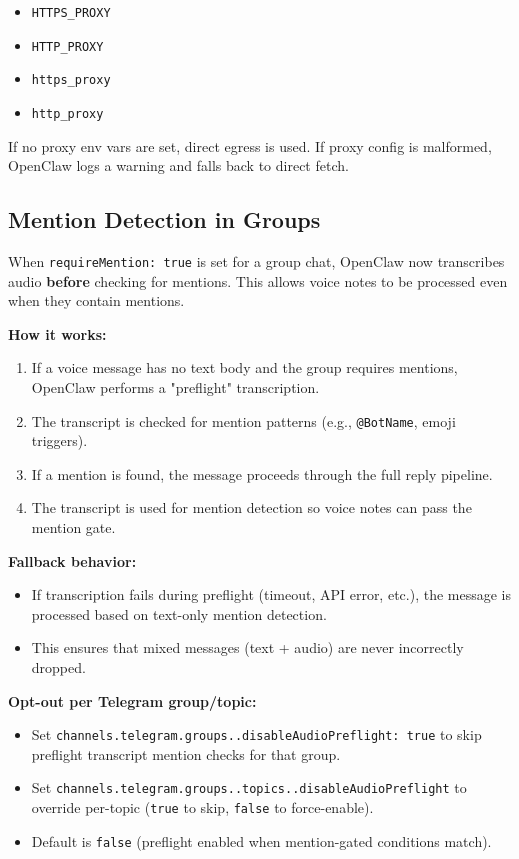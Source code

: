 \begin{itemize}
  \item \texttt{HTTPS\_PROXY}
  \item \texttt{HTTP\_PROXY}
  \item \texttt{https\_proxy}
  \item \texttt{http\_proxy}
\end{itemize}


If no proxy env vars are set, direct egress is used. If proxy config is malformed, OpenClaw logs a warning and falls back to direct fetch.

\subsection{Mention Detection in Groups}


When \texttt{requireMention: true} is set for a group chat, OpenClaw now transcribes audio \textbf{before} checking for mentions. This allows voice notes to be processed even when they contain mentions.

\textbf{How it works:}

\begin{enumerate}
  \item If a voice message has no text body and the group requires mentions, OpenClaw performs a "preflight" transcription.
  \item The transcript is checked for mention patterns (e.g., \texttt{@BotName}, emoji triggers).
  \item If a mention is found, the message proceeds through the full reply pipeline.
  \item The transcript is used for mention detection so voice notes can pass the mention gate.
\end{enumerate}


\textbf{Fallback behavior:}

\begin{itemize}
  \item If transcription fails during preflight (timeout, API error, etc.), the message is processed based on text-only mention detection.
  \item This ensures that mixed messages (text + audio) are never incorrectly dropped.
\end{itemize}


\textbf{Opt-out per Telegram group/topic:}

\begin{itemize}
  \item Set \texttt{channels.telegram.groups..disableAudioPreflight: true} to skip preflight transcript mention checks for that group.
  \item Set \texttt{channels.telegram.groups..topics..disableAudioPreflight} to override per-topic (\texttt{true} to skip, \texttt{false} to force-enable).
  \item Default is \texttt{false} (preflight enabled when mention-gated conditions match).
\end{itemize}


